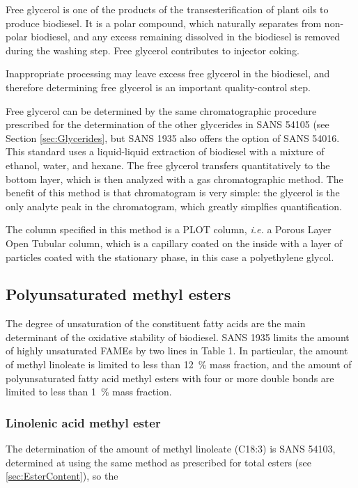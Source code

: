 Free glycerol is one of the products of the transesterification of plant oils to
produce biodiesel. It is a polar compound, which naturally separates from
non-polar biodiesel, and any excess remaining dissolved in the biodiesel is
removed during the washing step. Free glycerol contributes to injector coking. 

Inappropriate processing may leave excess free glycerol in the biodiesel, and
therefore determining free glycerol is an important quality-control step.

Free glycerol can be determined by the same chromatographic procedure prescribed
for the determination of the other glycerides in SANS 54105 (see Section
\ref{sec:Glycerides}, but SANS 1935 also offers the option of SANS 54016. This
standard uses a liquid-liquid extraction of biodiesel with a mixture of ethanol,
water, and hexane. The free glycerol transfers quantitatively to the bottom
layer, which is then analyzed with a gas chromatographic method. The benefit of
this method is that chromatogram is very simple: the glycerol is the only
analyte peak in the chromatogram, which greatly simplfies quantification.

The column specified in this method is a PLOT column, \textit{i.e.} a Porous
Layer Open Tubular column, which is a capillary coated on the inside with a
layer of particles coated with the stationary phase, in this case a polyethylene
glycol.

\subsection{Polyunsaturated methyl esters}
\label{sec:ChromDetUnsat}


The degree of unsaturation of the constituent fatty acids are the main
determinant of the oxidative stability of biodiesel. SANS 1935 limits the amount
of highly unsaturated FAMEs by two lines in Table 1. In particular, the amount
of methyl linoleate is limited to less than \SI{12}{\percent} mass fraction, and
the amount of polyunsaturated fatty acid methyl esters with four or more double
bonds are limited to less than \SI{1}{\percent} mass fraction.

\subsubsection{Linolenic acid methyl ester}

The determination of the amount of methyl linoleate (C18:3) is SANS 54103, determined
at using the same method as prescribed for total esters (see \ref{sec:EsterContent}), so the 

